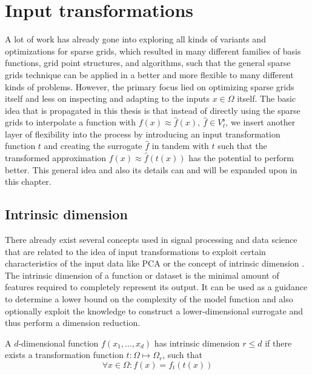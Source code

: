 \documentclass[
  a4paper,  %
  twoside,  %
  bibliography=totoc,
  headsepline,
  cleardoublepage=empty,
  parskip=half,
  draft=false
]{scrbook}
\begin{document}
\chapter{Input transformations}
\label{chap:c3}

A lot of work has already gone into exploring all kinds of variants and optimizations for sparse grids, which resulted in many different families of basis functions, grid point structures, and algorithms, such that the general sparse grids technique can be applied in a better and more flexible to many different kinds of problems.
However, the primary focus lied on optimizing sparse grids itself and less on inspecting and adapting to the inputs $x \in \Omega$ itself.
The basic idea that is propagated in this thesis is that instead of directly using the sparse grids to interpolate a function with $f(x) \approx \hat{f}(x), ~ \hat{f} \in V^{\text{s}}_{\ell}$, we insert another layer of flexibility into the process by introducing an input transformation function $t$ and creating the surrogate $\hat{f}$ in tandem with $t$ such that the transformed approximation $f(x) \approx \hat{f}(t(x))$ has the potential to perform better.
This general idea and also its details can and will be expanded upon in this chapter.

\section{Intrinsic dimension}

There already exist several concepts used in signal processing and data science that are related to the idea of input transformations to exploit certain characteristics of the input data like PCA \cite{} or the concept of intrinsic dimension \cite{}.
The intrinsic dimension of a function or dataset is the minimal amount of features required to completely represent its output.
It can be used as a guidance to determine a lower bound on the complexity of the model function and also optionally exploit the knowledge to construct a lower-dimensional surrogate and thus perform a dimension reduction.

\begin{definition}
A $d$-dimensional function $f(x_1, \dots, x_d)$ has intrinsic dimension $r \leq d$ if there exists a transformation function $t \colon \Omega \mapsto \Omega_r$, such that
\begin{equation}
\forall x \in \Omega \colon f(x)=f_t(t(x))
\end{equation}
\label{def:intrinsic}
\end{definition}
\end{document}

